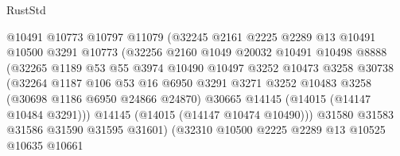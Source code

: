 \begin{lexlean}{RustStd}
\begin{coremodule}
                              @10491
                              @10773
                              @10797
                              @11079
                              (@32245
                                @2161
                                @2225
                                @2289
                                @13
                                @10491
                                @10500
                                @3291
                                @10773
                                (@32256
                                  @2160
                                  @1049
                                  @20032
                                  @10491
                                  @10498
                                  @8888
                                  (@32265
                                    @1189
                                    @53
                                    @55
                                    @3974
                                    @10490
                                    @10497
                                    @3252
                                    @10473
                                    @3258
                                    @30738
                                    (@32264
                                      @1187
                                      @106
                                      @53
                                      @16
                                      @6950
                                      @3291
                                      @3271
                                      @3252
                                      @10483
                                      @3258
                                      (@30698 @1186 @6950 @24866 @24870)
                                      @30665
                                      @14145
                                      (@14015 (@14147 @10484 @3291)))
                                    @14145
                                    (@14015 (@14147 @10474 @10490)))
                                  @31580
                                  @31583
                                  @31586
                                  @31590
                                  @31595
                                  @31601)
                                (@32310
                                  @10500
                                  @2225
                                  @2289
                                  @13
                                  @10525
                                  @10635
                                  @10661

\end{coremodule}
\end{lexlean}
